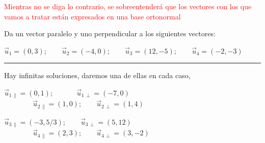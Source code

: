 \vspace{5mm} \textcolor{red}{Mientras no se diga lo contrario, se sobreentenderá que los vectores con los que vamos a tratar están expresados en una base ortonormal}	
	





\begin{miejercicio}	

Da un vector paralelo y uno perpendicular a los siguientes vectores:

$\vec u_1=(0,3);\qquad \vec u_2=(-4,0);\qquad \vec u_3=(12,-5);\qquad \vec u_4=(-2,-3)$

\rule{250pt}{0.1pt}

\vspace{2mm} Hay infinitas soluciones, daremos una de ellas en cada caso,

\vspace{2mm} $\vec u_{1\, \parallel}=(0,1);\qquad  \quad \ \vec u_{1\, \perp} =(-7,0)$
$\qquad \qquad \vec u_{2\, \parallel}=(1,0);\qquad  \vec u_{2\, \perp} =(1,4)$

\vspace{2mm} $\vec u_{3\, \parallel}=(-3,5/3);\qquad  \vec u_{3\, \perp} =(5,12)$
$\qquad \qquad \vec u_{4\, \parallel}=(2,3);\qquad  \vec u_{4\, \perp} =(3,-2)$

	
\end{miejercicio}


